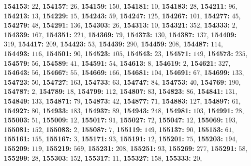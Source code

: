 \textsf{\bfseries 154153:} $22$, \textsf{\bfseries 154157:} $26$, \textsf{\bfseries 154159:} $150$, \textsf{\bfseries 154181:} $10$, \textsf{\bfseries 154183:} $28$, \textsf{\bfseries 154211:} $96$, \textsf{\bfseries 154213:} $13$, \textsf{\bfseries 154229:} $15$, \textsf{\bfseries 154243:} $59$, \textsf{\bfseries 154247:} $125$, \textsf{\bfseries 154267:} $101$, \textsf{\bfseries 154277:} $45$, \textsf{\bfseries 154279:} $48$, \textsf{\bfseries 154291:} $136$, \textsf{\bfseries 154303:} $26$, \textsf{\bfseries 154313:} $10$, \textsf{\bfseries 154321:} $352$, \textsf{\bfseries 154333:} $2$, \textsf{\bfseries 154339:} $167$, \textsf{\bfseries 154351:} $221$, \textsf{\bfseries 154369:} $79$, \textsf{\bfseries 154373:} $130$, \textsf{\bfseries 154387:} $137$, \textsf{\bfseries 154409:} $319$, \textsf{\bfseries 154417:} $209$, \textsf{\bfseries 154423:} $53$, \textsf{\bfseries 154439:} $290$, \textsf{\bfseries 154459:} $208$, \textsf{\bfseries 154487:} $114$, \textsf{\bfseries 154493:} $116$, \textsf{\bfseries 154501:} $90$, \textsf{\bfseries 154523:} $105$, \textsf{\bfseries 154543:} $23$, \textsf{\bfseries 154571:} $149$, \textsf{\bfseries 154573:} $235$, \textsf{\bfseries 154579:} $56$, \textsf{\bfseries 154589:} $41$, \textsf{\bfseries 154591:} $54$, \textsf{\bfseries 154613:} $8$, \textsf{\bfseries 154619:} $2$, \textsf{\bfseries 154621:} $327$, \textsf{\bfseries 154643:} $56$, \textsf{\bfseries 154667:} $55$, \textsf{\bfseries 154669:} $166$, \textsf{\bfseries 154681:} $104$, \textsf{\bfseries 154691:} $67$, \textsf{\bfseries 154699:} $133$, \textsf{\bfseries 154723:} $50$, \textsf{\bfseries 154727:} $163$, \textsf{\bfseries 154733:} $63$, \textsf{\bfseries 154747:} $84$, \textsf{\bfseries 154753:} $40$, \textsf{\bfseries 154769:} $190$, \textsf{\bfseries 154787:} $2$, \textsf{\bfseries 154789:} $18$, \textsf{\bfseries 154799:} $112$, \textsf{\bfseries 154807:} $83$, \textsf{\bfseries 154823:} $86$, \textsf{\bfseries 154841:} $131$, \textsf{\bfseries 154849:} $133$, \textsf{\bfseries 154871:} $79$, \textsf{\bfseries 154873:} $42$, \textsf{\bfseries 154877:} $71$, \textsf{\bfseries 154883:} $127$, \textsf{\bfseries 154897:} $61$, \textsf{\bfseries 154927:} $80$, \textsf{\bfseries 154933:} $183$, \textsf{\bfseries 154937:} $89$, \textsf{\bfseries 154943:} $248$, \textsf{\bfseries 154981:} $103$, \textsf{\bfseries 154991:} $28$, \textsf{\bfseries 155003:} $51$, \textsf{\bfseries 155009:} $12$, \textsf{\bfseries 155017:} $91$, \textsf{\bfseries 155027:} $72$, \textsf{\bfseries 155047:} $12$, \textsf{\bfseries 155069:} $193$, \textsf{\bfseries 155081:} $152$, \textsf{\bfseries 155083:} $2$, \textsf{\bfseries 155087:} $7$, \textsf{\bfseries 155119:} $149$, \textsf{\bfseries 155137:} $90$, \textsf{\bfseries 155153:} $61$, \textsf{\bfseries 155161:} $155$, \textsf{\bfseries 155167:} $3$, \textsf{\bfseries 155171:} $93$, \textsf{\bfseries 155191:} $12$, \textsf{\bfseries 155201:} $75$, \textsf{\bfseries 155203:} $194$, \textsf{\bfseries 155209:} $119$, \textsf{\bfseries 155219:} $569$, \textsf{\bfseries 155231:} $208$, \textsf{\bfseries 155251:} $93$, \textsf{\bfseries 155269:} $277$, \textsf{\bfseries 155291:} $58$, \textsf{\bfseries 155299:} $28$, \textsf{\bfseries 155303:} $152$, \textsf{\bfseries 155317:} $11$, \textsf{\bfseries 155327:} $158$, \textsf{\bfseries 155333:} $20$, 
